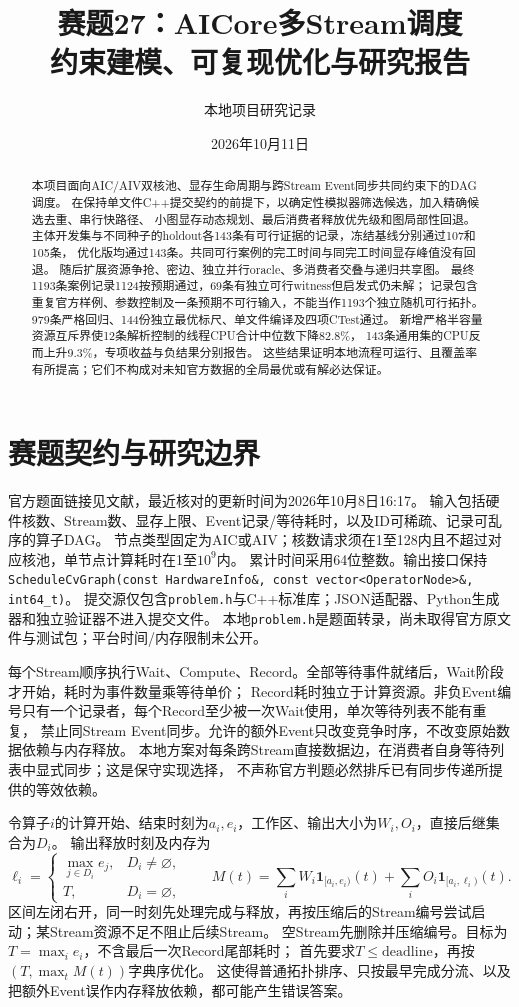 \documentclass[UTF8,a4paper,11pt,fontset=fandol]{ctexart}
\title{赛题27：AICore多Stream调度\\约束建模、可复现优化与研究报告}
\author{本地项目研究记录}
\date{2026年10月11日}
\begin{document}
\maketitle
\begin{abstract}
本项目面向AIC/AIV双核池、显存生命周期与跨Stream Event同步共同约束下的DAG调度。
在保持单文件C++提交契约的前提下，以确定性模拟器筛选候选，加入精确候选去重、串行快路径、
小图显存动态规划、最后消费者释放优先级和图局部性回退。
主体开发集与不同种子的holdout各143条有可行证据的记录，冻结基线分别通过107和105条，
优化版均通过143条。共同可行案例的完工时间与同完工时间显存峰值没有回退。
随后扩展资源争抢、密边、独立并行oracle、多消费者交叠与递归共享图。
最终1193条案例记录1124按预期通过，69条有独立可行witness但启发式仍未解；
记录包含重复官方样例、参数控制及一条预期不可行输入，不能当作1193个独立随机可行拓扑。
979条严格回归、144份独立最优标尺、单文件编译及四项CTest通过。
新增严格半容量资源互斥界使12条解析控制的线程CPU合计中位数下降82.8\%，
143条通用集的CPU反而上升9.3\%，专项收益与负结果分别报告。
这些结果证明本地流程可运行、且覆盖率有所提高；它们不构成对未知官方数据的全局最优或有解必达保证。
\end{abstract}

\section{赛题契约与研究边界}
官方题面链接见文献\cite{official}，最近核对的更新时间为2026年10月8日16:17。
输入包括硬件核数、Stream数、显存上限、Event记录/等待耗时，以及ID可稀疏、记录可乱序的算子DAG。
节点类型固定为AIC或AIV；核数请求须在1至128内且不超过对应核池，单节点计算耗时在1至$10^9$内。
累计时间采用64位整数。输出接口保持
\texttt{ScheduleCvGraph(const HardwareInfo\&, const vector<OperatorNode>\&, int64\_t)}。
提交源仅包含\texttt{problem.h}与C++标准库；JSON适配器、Python生成器和独立验证器不进入提交文件。
本地\texttt{problem.h}是题面转录，尚未取得官方原文件与测试包；平台时间/内存限制未公开。

每个Stream顺序执行Wait、Compute、Record。全部等待事件就绪后，Wait阶段才开始，耗时为事件数量乘等待单价；
Record耗时独立于计算资源。非负Event编号只有一个记录者，每个Record至少被一次Wait使用，单次等待列表不能有重复，
禁止同Stream Event同步。允许的额外Event只改变竞争时序，不改变原始数据依赖与内存释放。
本地方案对每条跨Stream直接数据边，在消费者自身等待列表中显式同步；这是保守实现选择，
不声称官方判题必然排斥已有同步传递所提供的等效依赖。

令算子$i$的计算开始、结束时刻为$a_i,e_i$，工作区、输出大小为$W_i,O_i$，直接后继集合为$D_i$。
输出释放时刻及内存为
\[
 \ell_i=\begin{cases}\max_{j\in D_i} e_j,&D_i\ne\varnothing,\\T,&D_i=\varnothing,\end{cases}
 \qquad M(t)=\sum_i W_i\mathbf1_{[a_i,e_i)}(t)+\sum_i O_i\mathbf1_{[a_i,\ell_i)}(t).
\]
区间左闭右开，同一时刻先处理完成与释放，再按压缩后的Stream编号尝试启动；某Stream资源不足不阻止后续Stream。
空Stream先删除并压缩编号。目标为$T=\max_i e_i$，不含最后一次Record尾部耗时；
首先要求$T\leq\mathrm{deadline}$，再按$(T,\max_t M(t))$字典序优化。
这使得普通拓扑排序、只按最早完成分流、以及把额外Event误作内存释放依赖，都可能产生错误答案。
\end{document}
